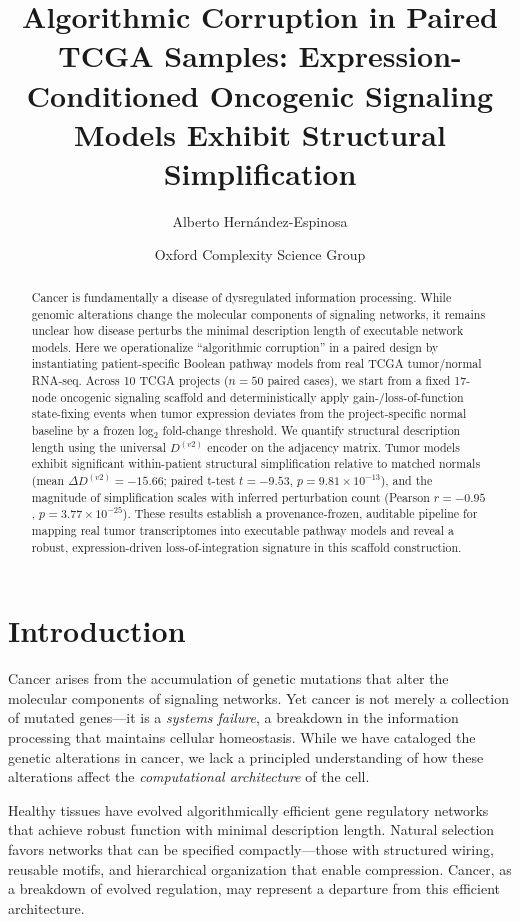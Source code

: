 \documentclass[11pt]{article}
\title{Algorithmic Corruption in Paired TCGA Samples: Expression-Conditioned Oncogenic Signaling Models Exhibit Structural Simplification}
\author[1,*]{Alberto Hernández-Espinosa}
\author[1]{Oxford Complexity Science Group}
\affil[1]{Department of Computer Science, University of Oxford}
\affil[*]{Corresponding author: alberto.hernandez@oxford.ac.uk}
\date{}
\begin{document}
\maketitle

\begin{abstract}
\noindent
Cancer is fundamentally a disease of dysregulated information processing. While genomic alterations change the molecular components of signaling networks, it remains unclear how disease perturbs the minimal description length of executable network models. Here we operationalize ``algorithmic corruption'' in a paired design by instantiating patient-specific Boolean pathway models from real TCGA tumor/normal RNA-seq. Across 10 TCGA projects ($n=50$ paired cases), we start from a fixed 17-node oncogenic signaling scaffold and deterministically apply gain-/loss-of-function state-fixing events when tumor expression deviates from the project-specific normal baseline by a frozen log$_2$ fold-change threshold. We quantify structural description length using the universal $D^{(v2)}$ encoder on the adjacency matrix. Tumor models exhibit significant within-patient structural simplification relative to matched normals (mean $\Delta D^{(v2)}=-15.66$; paired t-test $t=-9.53$, $p=9.81\times 10^{-13}$), and the magnitude of simplification scales with inferred perturbation count (Pearson $r=-0.95$, $p=3.77\times 10^{-25}$). These results establish a provenance-frozen, auditable pipeline for mapping real tumor transcriptomes into executable pathway models and reveal a robust, expression-driven loss-of-integration signature in this scaffold construction.
\end{abstract}

\section*{Introduction}

Cancer arises from the accumulation of genetic mutations that alter the molecular components of signaling networks\cite{Hanahan2011, Vogelstein2013}. Yet cancer is not merely a collection of mutated genes---it is a \textit{systems failure}, a breakdown in the information processing that maintains cellular homeostasis. While we have cataloged the genetic alterations in cancer, we lack a principled understanding of how these alterations affect the \textit{computational architecture} of the cell.

Healthy tissues have evolved algorithmically efficient gene regulatory networks that achieve robust function with minimal description length\cite{Hernandez2025}. Natural selection favors networks that can be specified compactly---those with structured wiring, reusable motifs, and hierarchical organization that enable compression. Cancer, as a breakdown of evolved regulation, may represent a departure from this efficient architecture.
\end{document}
